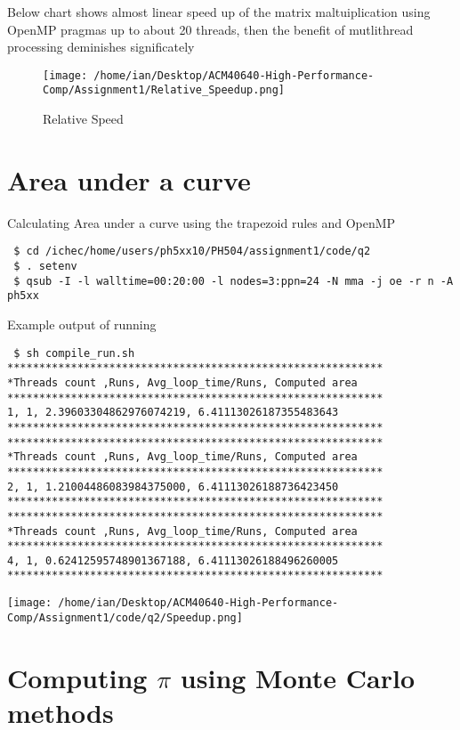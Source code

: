 \documentclass[a4paper]{article}
\begin{document}
\vspace{5mm}

Below chart shows almost linear speed up of the matrix maltuiplication using OpenMP pragmas up to about 20 threads, then the benefit of mutlithread processing 
deminishes significately

\begin{figure}[H]
\centering
\texttt{[image: /home/ian/Desktop/ACM40640-High-Performance-Comp/Assignment1/Relative\_Speedup.png]}
\caption{\label{fig:data}Relative Speed}
\end{figure}


\newpage
\section{Area under a curve}

Calculating Area under a curve using the trapezoid rules and OpenMP

\begin{verbatim}
 $ cd /ichec/home/users/ph5xx10/PH504/assignment1/code/q2
 $ . setenv
 $ qsub -I -l walltime=00:20:00 -l nodes=3:ppn=24 -N mma -j oe -r n -A ph5xx
\end{verbatim}

Example output of running 
\begin{verbatim}
 $ sh compile_run.sh 
***********************************************************
*Threads count ,Runs, Avg_loop_time/Runs, Computed area
***********************************************************
1, 1, 2.39603304862976074219, 6.41113026187355483643
***********************************************************
***********************************************************
*Threads count ,Runs, Avg_loop_time/Runs, Computed area
***********************************************************
2, 1, 1.21004486083984375000, 6.41113026188736423450
***********************************************************
***********************************************************
*Threads count ,Runs, Avg_loop_time/Runs, Computed area
***********************************************************
4, 1, 0.62412595748901367188, 6.41113026188496260005
***********************************************************
\end{verbatim}


\texttt{[image: /home/ian/Desktop/ACM40640-High-Performance-Comp/Assignment1/code/q2/Speedup.png]}

\newpage
\section{Computing $\pi$ using Monte Carlo methods}
\end{document}
